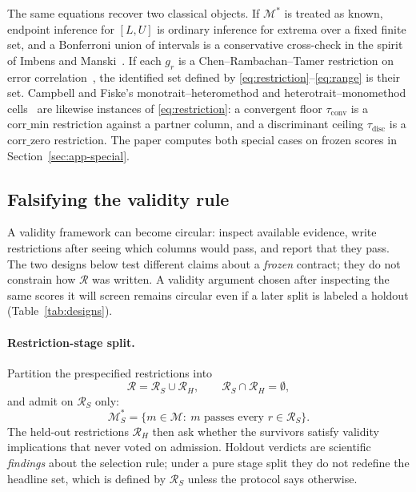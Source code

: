 \documentclass[10pt,letterpaper]{article}
\newcommand{\M}{\ensuremath{\mathcal{M}}}
\newcommand{\Rset}{\mathcal{R}}
\begin{document}
The same equations recover two classical objects.
If $\M^*$ is treated as known, endpoint inference for $[L,U]$ is ordinary inference for extrema over a fixed finite set, and a Bonferroni union of intervals is a conservative cross-check in the spirit of Imbens and Manski~\cite{imbensmanski2004}.
If each $g_r$ is a Chen--Rambachan--Tamer restriction on error correlation~\cite{chenrttamer2026}, the identified set defined by \eqref{eq:restriction}--\eqref{eq:range} is their set.
Campbell and Fiske's monotrait--heteromethod and heterotrait--monomethod cells~\cite{campbell1959} are likewise instances of \eqref{eq:restriction}: a convergent floor $\tau_{\mathrm{conv}}$ is a $\mathrm{corr\_min}$ restriction against a partner column, and a discriminant ceiling $\tau_{\mathrm{disc}}$ is a $\mathrm{corr\_zero}$ restriction.
The paper computes both special cases on frozen scores in Section~\ref{sec:app-special}.

\subsection{Falsifying the validity rule}
\label{sec:falsify}

A validity framework can become circular: inspect available evidence, write restrictions after seeing which columns would pass, and report that they pass.
The two designs below test different claims about a \emph{frozen} contract; they do not constrain how $\Rset$ was written.
A validity argument chosen after inspecting the same scores it will screen remains circular even if a later split is labeled a holdout (Table~\ref{tab:designs}).

\paragraph{Restriction-stage split.}
Partition the prespecified restrictions into
\begin{equation}
\Rset=\Rset_S\cup\Rset_H,\qquad \Rset_S\cap\Rset_H=\emptyset,
\label{eq:partition}
\end{equation}
and admit on $\Rset_S$ only:
\begin{equation}
\M^*_S=\bigl\{m\in\M:\ m\text{ passes every }r\in\Rset_S\bigr\}.
\label{eq:Mselect}
\end{equation}
The held-out restrictions $\Rset_H$ then ask whether the survivors satisfy validity implications that never voted on admission.
Holdout verdicts are scientific \emph{findings} about the selection rule; under a pure stage split they do not redefine the headline set, which is defined by $\Rset_S$ unless the protocol says otherwise.
\end{document}
